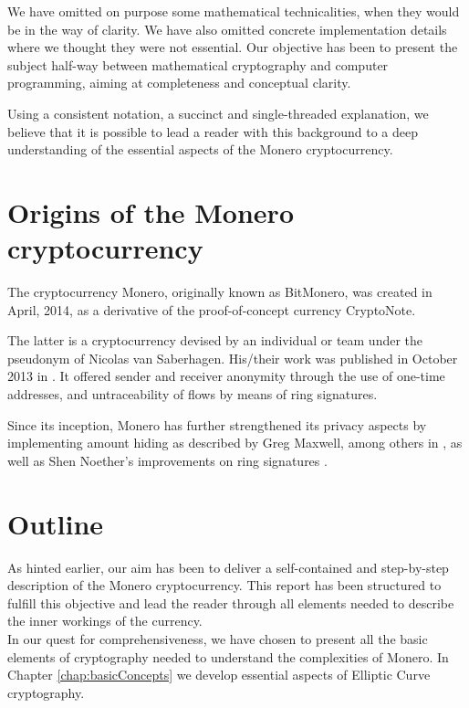 We have omitted on purpose some mathematical technicalities, when they would be in the way of clarity.
We have also omitted concrete implementation details where we thought they were not essential.
Our objective has been to present the subject half-way between mathematical cryptography and 
computer programming, aiming at completeness and conceptual clarity.

Using a consistent
notation, a succinct and single-threaded explanation, 
we believe that it is possible to lead a reader with this background to a deep understanding
of the essential aspects of the Monero cryptocurrency.  


\section{Origins of the Monero cryptocurrency}

The cryptocurrency Monero, originally known as BitMonero, was created in April, 2014, as a derivative of the proof-of-concept currency CryptoNote.

The latter is a cryptocurrency devised by an individual or team under the pseudonym of Nicolas van Saberhagen. His/their work was published in October 2013 in \cite{cryptoNoteWhitePaper}.
It offered sender and receiver anonymity through the use of one-time addresses, and untraceability of flows
by means of ring signatures.

Since its inception, Monero has further strengthened its privacy aspects by implementing amount hiding as described by
Greg Maxwell, among others in \cite{Signatures2015BorromeanRS}, as well as Shen Noether's improvements
on ring signatures \cite{ledger34}.
  

\section{Outline}

As hinted earlier, our aim has been to deliver a self-contained and step-by-step description of the Monero
cryptocurrency. This report has been structured to fulfill this objective and
lead the reader through all elements needed to describe the inner workings of the currency.
\\

In our quest for comprehensiveness, we have chosen to present all the basic elements of cryptography
needed to understand the complexities of Monero. In Chapter \ref{chap:basicConcepts} we develop essential
aspects of Elliptic Curve cryptography.

